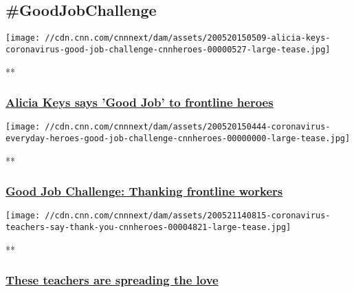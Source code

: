\hypertarget{goodjobchallenge}{%
\subsection{\#GoodJobChallenge}\label{goodjobchallenge}}

\href{/videos/tv/2020/05/20/alicia-keys-coronavirus-good-job-challenge-cnnheroes.cnn}{}

\texttt{[image: //cdn.cnn.com/cnnnext/dam/assets/200520150509-alicia-keys-coronavirus-good-job-challenge-cnnheroes-00000527-large-tease.jpg]}

**

\hypertarget{alicia-keys-says-good-job-to-frontline-heroes-1}{%
\subsubsection{\texorpdfstring{\href{/videos/tv/2020/05/20/alicia-keys-coronavirus-good-job-challenge-cnnheroes.cnn}{Alicia
Keys says 'Good Job' to frontline
heroes}}{Alicia Keys says 'Good Job' to frontline heroes}}\label{alicia-keys-says-good-job-to-frontline-heroes-1}}

\href{/videos/tv/2020/05/20/coronavirus-everyday-heroes-good-job-challenge-cnnheroes.cnn}{}

\texttt{[image: //cdn.cnn.com/cnnnext/dam/assets/200520150444-coronavirus-everyday-heroes-good-job-challenge-cnnheroes-00000000-large-tease.jpg]}

**

\hypertarget{good-job-challenge-thanking-frontline-workers}{%
\subsubsection{\texorpdfstring{\href{/videos/tv/2020/05/20/coronavirus-everyday-heroes-good-job-challenge-cnnheroes.cnn}{Good
Job Challenge: Thanking frontline
workers}}{Good Job Challenge: Thanking frontline workers}}\label{good-job-challenge-thanking-frontline-workers}}

\href{/videos/tv/2020/05/21/coronavirus-teachers-say-thank-you-cnnheroes.cnn}{}

\texttt{[image: //cdn.cnn.com/cnnnext/dam/assets/200521140815-coronavirus-teachers-say-thank-you-cnnheroes-00004821-large-tease.jpg]}

**

\hypertarget{these-teachers-are-spreading-the-love}{%
\subsubsection{\texorpdfstring{\href{/videos/tv/2020/05/21/coronavirus-teachers-say-thank-you-cnnheroes.cnn}{These
teachers are spreading the
love}}{These teachers are spreading the love}}\label{these-teachers-are-spreading-the-love}}

